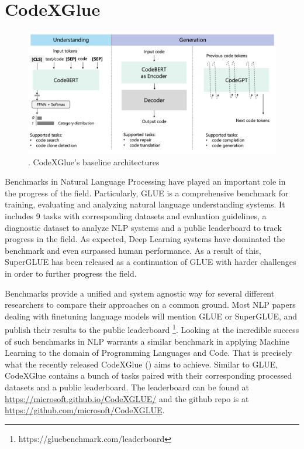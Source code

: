 \documentclass{article}
\begin{document}
\section{CodeXGlue}

\begin{figure}[ht]
    \centering
    \centerline{\includegraphics[width=\textwidth]{Images/codexgluebaselines.png}}
    \caption{\citet{lu2021codexglue}. CodeXGlue's baseline architectures}
    \label{codexgluebaselines}
\end{figure}

Benchmarks in Natural Language Processing have played an important role in the progress of the field. Particularly, GLUE \cite{wang2018glue} is a comprehensive benchmark for training, evaluating and analyzing natural language understanding systems. It includes 9 tasks with corresponding datasets and evaluation guidelines, a diagnostic dataset to analyze NLP systems and a public leaderboard to track progress in the field. As expected, Deep Learning systems have dominated the benchmark and even surpassed human performance. As a result of this, SuperGLUE \cite{wang2019superglue} has been released as a continuation of GLUE with harder challenges in order to further progress the field.

Benchmarks provide a unified and system agnostic way for several different researchers to compare their approaches on a common ground. Most NLP papers dealing with finetuning language models will mention GLUE or SuperGLUE, and publish their results to the public leaderboard \footnote{https://gluebenchmark.com/leaderboard}. Looking at the incredible success of such benchmarks in NLP warrants a similar benchmark in applying Machine Learning to the domain of Programming Languages and Code. That is precisely what the recently released CodeXGlue (\citet{lu2021codexglue}) aims to achieve. Similar to GLUE, CodeXGlue contains a bunch of tasks paired with their corresponding processed datasets and a public leaderboard. The leaderboard can be found at \url{https://microsoft.github.io/CodeXGLUE/} and the github repo is at \url{https://github.com/microsoft/CodeXGLUE}.
\end{document}
